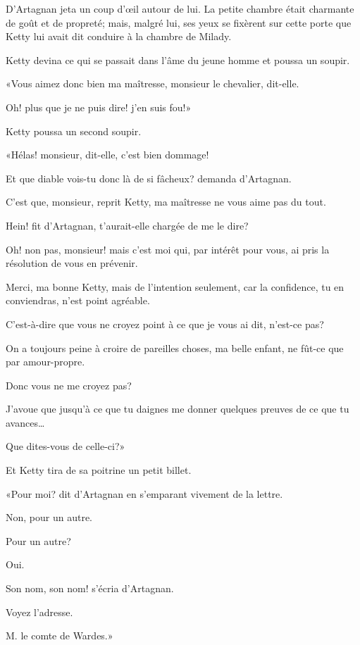 D'Artagnan jeta un coup d'œil autour de lui. La petite chambre était charmante de goût et de propreté; mais, malgré lui, ses yeux se fixèrent sur cette porte que Ketty lui avait dit conduire à la chambre de Milady. 

Ketty devina ce qui se passait dans l'âme du jeune homme et poussa un soupir. 

«Vous aimez donc bien ma maîtresse, monsieur le chevalier, dit-elle. 

\speak  Oh! plus que je ne puis dire! j'en suis fou!» 

Ketty poussa un second soupir. 

«Hélas! monsieur, dit-elle, c'est bien dommage! 

\speak  Et que diable vois-tu donc là de si fâcheux? demanda d'Artagnan. 

\speak  C'est que, monsieur, reprit Ketty, ma maîtresse ne vous aime pas du tout. 

\speak  Hein! fit d'Artagnan, t'aurait-elle chargée de me le dire? 

\speak  Oh! non pas, monsieur! mais c'est moi qui, par intérêt pour vous, ai pris la résolution de vous en prévenir. 

\speak  Merci, ma bonne Ketty, mais de l'intention seulement, car la confidence, tu en conviendras, n'est point agréable. 

\speak  C'est-à-dire que vous ne croyez point à ce que je vous ai dit, n'est-ce pas? 

\speak  On a toujours peine à croire de pareilles choses, ma belle enfant, ne fût-ce que par amour-propre. 

\speak  Donc vous ne me croyez pas? 

\speak  J'avoue que jusqu'à ce que tu daignes me donner quelques preuves de ce que tu avances\dots 

\speak  Que dites-vous de celle-ci?» 

Et Ketty tira de sa poitrine un petit billet. 

«Pour moi? dit d'Artagnan en s'emparant vivement de la lettre. 

\speak  Non, pour un autre. 

\speak  Pour un autre? 

\speak  Oui. 

\speak  Son nom, son nom! s'écria d'Artagnan. 

\speak  Voyez l'adresse. 

\speak  M. le comte de Wardes.» 

